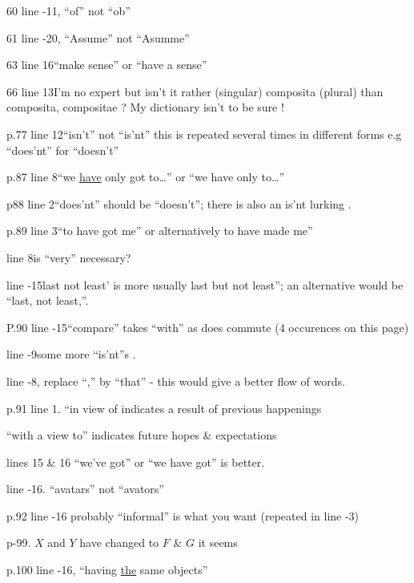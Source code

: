 60 line -11, ``of'' not ``ob''

61 line -20, ``Assume'' not ``Asumme''

63 line 16\quad ``make sense'' or ``have a sense''

66 line 13\quad I'm no  expert but isn't it rather  (singular) composita (plural) than composita, compositae ? My  dictionary isn't  to be sure !

p.77 line 12\quad ``isn't'' not ``is'nt'' this is repeated several times in different forms e.g ``does'nt'' for ``doesn't''

p.87 line 8\quad ``we \uline{have} only got to\ldots'' or ``we have only to\ldots''

p88 line 2\quad ``does'nt'' should be ``doesn't''; there is also an is'nt lurking .

p.89 line 3\quad ``to have got me'' or alternatively to have made me''

line 8\quad is ``very'' necessary?

line -15\quad {}last not least’ is more usually last but not least''; an alternative would be ``last, not least,''.

P.90 line -15\quad ``compare'' takes ``with'' as does commute (4 occurences on this page)

line -9\quad some more ``is'nt''s .

line -8, replace ``,'' by ``that'' - this would give a better flow of words.


p.91 line 1. ``in view of indicates a result of previous happenings

``with a view to'' indicates future hopes \& expectations

lines 15 \& 16 ``we've got'' or ``we have got'' is better.

line -16. ``avatars'' not ``avators''

p.92 line -16 probably ``informal'' is what you want (repeated in line -3)

p-99. $X$ and $Y$ have changed to $F$ \& $G$ it seems

p.100 line -16, ``having \uline{the} same objects''



